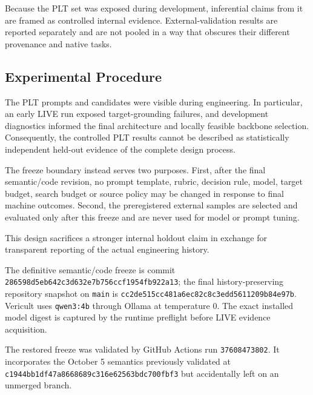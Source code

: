 Because the PLT set was exposed during development, inferential claims from it are framed as controlled internal evidence. External-validation results are reported separately and are not pooled in a way that obscures their different provenance and native tasks.

\subsection{Experimental Procedure}
The PLT prompts and candidates were visible during engineering. In particular, an early LIVE run exposed target-grounding failures, and development diagnostics informed the final architecture and locally feasible backbone selection. Consequently, the controlled PLT results cannot be described as statistically independent held-out evidence of the complete design process.

The freeze boundary instead serves two purposes. First, after the final semantic/code revision, no prompt template, rubric, decision rule, model, target budget, search budget or source policy may be changed in response to final machine outcomes. Second, the preregistered external samples are selected and evaluated only after this freeze and are never used for model or prompt tuning.

This design sacrifices a stronger internal holdout claim in exchange for transparent reporting of the actual engineering history.

The definitive semantic/code freeze is commit
\texttt{286598d5eb642c3d632e7b756ccf1954fb922a13}; the final history-preserving repository snapshot on \texttt{main} is
\texttt{cc2de515cc481a6ec82c8c3edd5611209b84e97b}. Vericult uses \texttt{qwen3:4b} through Ollama at temperature 0. The exact installed model digest is captured by the runtime preflight before LIVE evidence acquisition.

The restored freeze was validated by GitHub Actions run \texttt{37608473802}. It incorporates the October 5 semantics previously validated at \texttt{c1944bb1df47a8668689c316e62563bdc700fbf3} but accidentally left on an unmerged branch.

